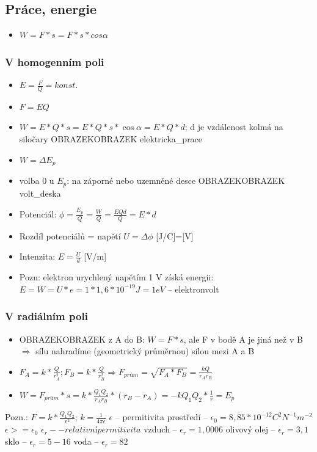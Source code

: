 \documentclass{article}
\begin{document}
\subsection{Práce, energie}
\begin{itemize}
  \item $W = F*s = F*s*cos \alpha $
\end{itemize}
\subsubsection{V homogenním poli}
\begin{itemize}
  \item $E = \frac{F}{Q} = konst.$
  \item $F = EQ$
  \item $W = E*Q*s = E*Q*s*\cos \alpha = E*Q*d$; d je vzdálenost kolmá na siločary OBRAZEKOBRAZEK elektricka\_prace
  \item $W = \Delta E_p$
  \item volba 0 u $E_p$: na záporné nebo uzemněné desce OBRAZEKOBRAZEK volt\_deska
  \item Potenciál: $\phi = \frac{E_p}{Q} = \frac{W}{Q} = \frac{EQd}{Q} = E*d$
  \item Rozdíl potenciálů = napětí $U = \Delta \phi$ [J/C]=[V]
  \item Intenzita: $E=\frac{U}{d}$ [V/m]
  \item Pozn: elektron urychlený napětím 1 V získá energii: $E = W = U*e = 1*1,6*10^{-19}J = 1 eV$ -- elektronvolt
\end{itemize}
\subsubsection{V radiálním poli}
\begin{itemize}
  \item OBRAZEKOBRAZEK z A do B: $W = F*s$, ale F v bodě A je jiná než v B $\Rightarrow$ sílu nahradíme  (geometrický průměrnou) silou mezi A a B
  \item $F_A = k*\frac{Q}{r_A^2}; F_B = k*\frac{Q}{r_B^2} \Rightarrow F_{prům} = \sqrt{F_A*F_B} = \frac{kQ}{r_A r_B}$
  \item $W=F_{prům}*s = k*\frac{Q_1 Q_2}{r_A r_B}*(r_B-r_A) = -kQ_1 Q_2*\frac{1}{r} = E_p$
\end{itemize}
Pozn.: $F = k*\frac{Q_1 Q_2}{r^2}$; $k = \frac{1}{4 \pi \epsilon}$
$\epsilon$ -- permitivita prostředí -- 
$\epsilon_0 = 8,85 * 10^{-12} C^2 N^{-1} m^{-2}$
$\epsilon >= \epsilon_0$
$\epsilon_r -- relativní permitivita$
vzduch -- $\epsilon_r = 1,0006$
olivový olej -- $\epsilon_r = 3,1$
sklo -- $\epsilon_r = 5-16$
voda -- $\epsilon_r = 82$
\end{document}
